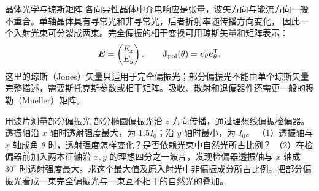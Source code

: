 \begin{starread}{晶体光学与琼斯矩阵}
各向异性晶体中介电响应是张量，波矢方向与能流方向一般不重合。单轴晶体具有寻常光和非寻常光，后者折射率随传播方向变化，
因此一个入射光束可分裂成两束。完全偏振的相干变换可用琼斯矢量和矩阵表示：
\[
 \bm{E}=\begin{pmatrix}E_x\\E_y\end{pmatrix},\qquad
 \mathbf J_{\rm pol}(\theta)=\bm{e}_\theta\bm{e}_\theta^{\mathsf T}.
\]
这里的琼斯（Jones）矢量只适用于完全偏振光；部分偏振光不能由单个琼斯矢量完整描述，需要斯托克斯参数或相干矩阵。吸收、散射和退偏器件还需更一般的穆勒（Mueller）矩阵。
\end{starread}


\begin{origexamplebox}{用波片测量部分偏振光}
\label{ch30:ex:depth-cai67}
部分椭圆偏振光沿 $z$ 方向传播，通过理想线偏振检偏器。透振轴沿 $x$ 轴时透射强度最大，为 $1.5I_0$；沿 $y$ 轴时最小，为 $I_0$。
（1）透振轴与 $x$ 轴成角 $\theta$ 时，透射强度怎样变化？是否依赖光束中自然光所占比例？
（2）在检偏器前加入两本征轴沿 $x,y$ 的理想四分之一波片，发现检偏器透振轴与 $x$ 轴成 $30^\circ$ 时透射强度最大。求这个最大值及原入射光中非偏振成分所占比例。把部分偏振光看成一束完全偏振光与一束互不相干的自然光的叠加。

\begin{center}\begin{minipage}{.96\linewidth}\centering
{}
\end{minipage}\end{center}
\end{origexamplebox}\par\nopagebreak[3]
